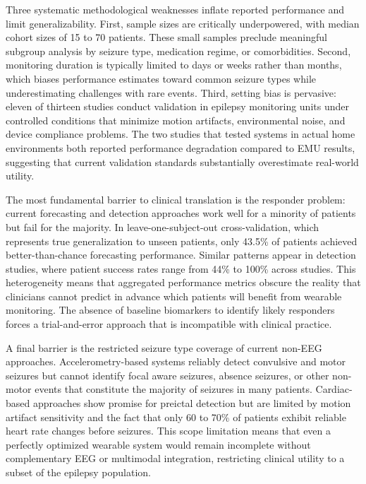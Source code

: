 Three systematic methodological weaknesses inflate reported performance and limit generalizability. First, sample sizes are critically underpowered, with median cohort sizes of 15 to 70 patients. These small samples preclude meaningful subgroup analysis by seizure type, medication regime, or comorbidities. Second, monitoring duration is typically limited to days or weeks rather than months, which biases performance estimates toward common seizure types while underestimating challenges with rare events. Third, setting bias is pervasive: eleven of thirteen studies conduct validation in epilepsy monitoring units under controlled conditions that minimize motion artifacts, environmental noise, and device compliance problems. The two studies that tested systems in actual home environments both reported performance degradation compared to EMU results, suggesting that current validation standards substantially overestimate real-world utility.

The most fundamental barrier to clinical translation is the responder problem: current forecasting and detection approaches work well for a minority of patients but fail for the majority. In leave-one-subject-out cross-validation, which represents true generalization to unseen patients, only 43.5\% of patients achieved better-than-chance forecasting performance. Similar patterns appear in detection studies, where patient success rates range from 44\% to 100\% across studies. This heterogeneity means that aggregated performance metrics obscure the reality that clinicians cannot predict in advance which patients will benefit from wearable monitoring. The absence of baseline biomarkers to identify likely responders forces a trial-and-error approach that is incompatible with clinical practice.

A final barrier is the restricted seizure type coverage of current non-EEG approaches. Accelerometry-based systems reliably detect convulsive and motor seizures but cannot identify focal aware seizures, absence seizures, or other non-motor events that constitute the majority of seizures in many patients. Cardiac-based approaches show promise for preictal detection but are limited by motion artifact sensitivity and the fact that only 60 to 70\% of patients exhibit reliable heart rate changes before seizures. This scope limitation means that even a perfectly optimized wearable system would remain incomplete without complementary EEG or multimodal integration, restricting clinical utility to a subset of the epilepsy population.

